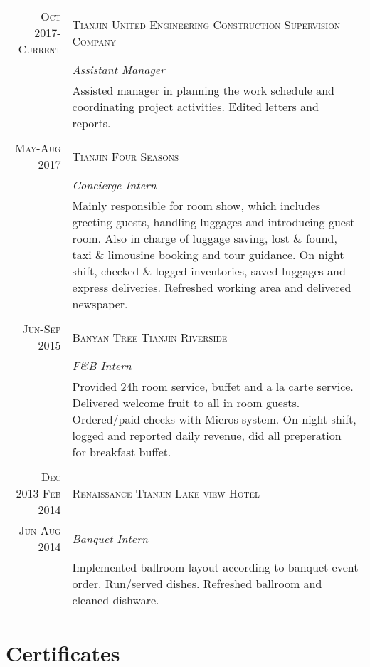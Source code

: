 \documentclass[11pt,a4paper]{article}
\begin{document}
\noindent\begin{tabular}{r|p{9.5cm}}

\textsc{Oct 2017-Current} 
	& \textsc{Tianjin United Engineering Construction Supervision Company
}\\
	&\emph{Assistant Manager}\\

	&Assisted manager in planning the work schedule and coordinating project activities. Edited letters and reports.\\
\multicolumn{2}{c}{} \\


\textsc{May-Aug 2017} 
	& \textsc{Tianjin Four Seasons}\\
	&\emph{Concierge Intern}\\

	&Mainly responsible for room show, which includes 
	greeting guests, handling luggages and introducing guest room. 
	Also in charge of luggage saving, lost \& found, 
	taxi \& limousine booking and tour guidance. 
	On night shift, checked \& logged inventories, 
	saved luggages and express deliveries. 
	Refreshed working area and delivered newspaper.\\
\multicolumn{2}{c}{} \\


\textsc{Jun-Sep 2015} 
	& \textsc{Banyan Tree Tianjin Riverside}\\
	&\emph{F\&B Intern}\\
	
	&Provided 24h room service, 
	buffet and a la carte service. 
	Delivered welcome fruit to all in room guests. 
	Ordered/paid checks with Micros system. 
	On night shift,	logged and reported daily revenue, 
	did all preperation for breakfast buffet.\\
\multicolumn{2}{c}{} \\

\textsc{Dec 2013-Feb 2014} 
	& \textsc{Renaissance Tianjin Lake view Hotel}\\
\textsc{Jun-Aug 2014} 
	& \emph{Banquet Intern}\\
	& Implemented ballroom layout according to banquet event order. 
	Run/served dishes.
	Refreshed ballroom and cleaned dishware.\\

\end{tabular}

\section{Certificates}
\end{document}
